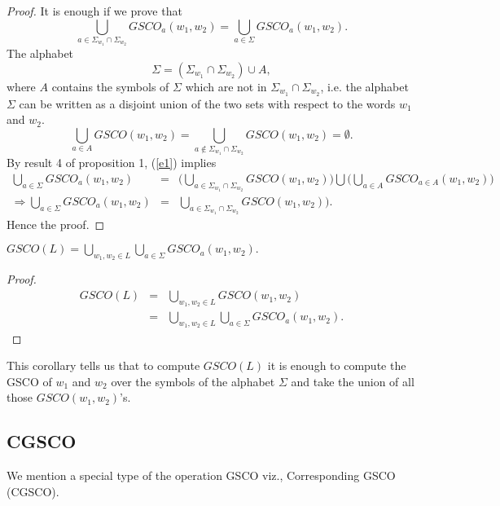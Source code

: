 \documentclass{llncs}
\newcommand{\sg}{\Sigma}
\begin{document}
\begin{proof}
It is enough if we prove that
\[\bigcup_{a\in\sg_{w_1}\cap\sg_{w_2}}GSCO_a(w_1,w_2)=\bigcup_{a\in\sg}GSCO_a(w_1,w_2).\]
The alphabet
\begin{equation}\label{e1}
\sg=(\sg_{w_1}\cap\sg_{w_2})\cup A,
\end{equation}
where $A$ contains the symbols of $\sg$ which are not in
$\sg_{w_1}\cap\sg_{w_2}$, i.e. the alphabet $\sg$ can be written as
a disjoint union of the two sets with respect to the words $w_1$ and
$w_2$.
\begin{equation}
\bigcup_{a\in
A}GSCO(w_1,w_2)=\bigcup_{a\notin\sg_{w_1}\cap\sg_{w_2}}GSCO(w_1,w_2)=\emptyset.
\end{equation}
By result 4 of proposition 1, (\ref{e1}) implies
\begin{eqnarray*}
\bigcup_{a\in\sg}GSCO_a(w_1,w_2)&=&\big(\bigcup_{a\in\sg_{w_1}\cap\sg_{w_2}}
GSCO(w_1,w_2)\big)\bigcup\big(\bigcup_{a\in A}GSCO_{a\in A}(w_1,w_2)\big)\\
\Rightarrow\bigcup_{a\in\sg}GSCO_a(w_1,w_2)&=&\bigcup_{a\in\sg_{w_1}\cap
\sg_{w_2}}GSCO(w_1,w_2)\big).
\end{eqnarray*}
Hence the proof.
\end{proof}
\begin{corollary}
$GSCO(L)=\bigcup_{w_1,w_2\in L}\bigcup_{a\in\sg}GSCO_a(w_1,w_2).$
\end{corollary}
\begin{proof}
\begin{eqnarray*}
GSCO(L)&=&\bigcup_{w_1,w_2\in L}GSCO(w_1,w_2)\\
    &=&\bigcup_{w_1,w_2\in L}\bigcup_{a\in\sg}GSCO_a(w_1,w_2).
\end{eqnarray*}
\end{proof}
\par This corollary tells us that to compute $GSCO(L)$ it is enough to compute the GSCO of
 $w_1$ and $w_2$ over the symbols of the alphabet $\sg$ and take the union of all those
 $ GSCO(w_1,w_2)$'s.

\subsection{CGSCO}
\par We mention a special type of the operation GSCO  viz.,  Corresponding GSCO (CGSCO).
\end{document}
